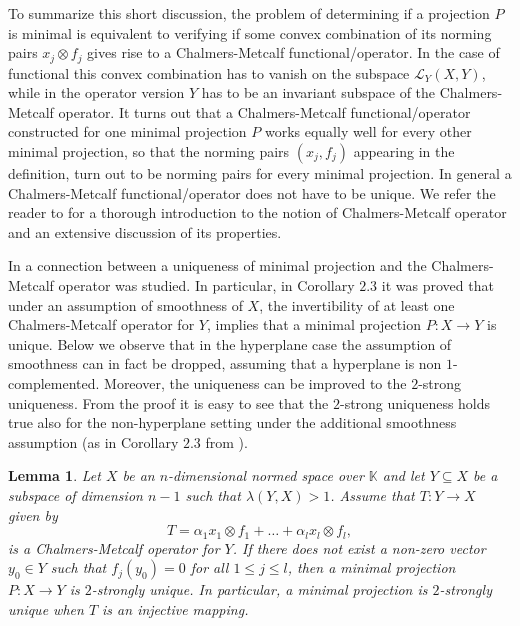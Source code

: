 \documentclass[12pt, reqno]{amsart}
\newtheorem{lem}[twr]{Lemma}
\theoremstyle{definition}
\theoremstyle{remark}
\numberwithin{equation}{section}
\begin{document}
To summarize this short discussion, the problem of determining if a projection $P$ is minimal is equivalent to verifying if some convex combination of its norming pairs $x_j \otimes f_j$ gives rise to a Chalmers-Metcalf functional/operator. In the case of functional this convex combination has to vanish on the subspace $\mathcal{L}_Y(X, Y)$, while in the operator version $Y$ has to be an invariant subspace of the Chalmers-Metcalf operator. It turns out that a Chalmers-Metcalf functional/operator constructed for one minimal projection $P$ works equally well for every other minimal projection, so that the norming pairs $(x_j, f_j)$ appearing in the definition, turn out to be norming pairs for every minimal projection. In general a Chalmers-Metcalf functional/operator does not have to be unique. We refer the reader to \cite{lewickiskrzypekoperator2} for a thorough introduction to the notion of Chalmers-Metcalf operator and an extensive discussion of its properties.

In \cite{lewickiskrzypekoperator} a connection between a uniqueness of minimal projection and the Chalmers-Metcalf operator was studied. In particular, in Corollary $2.3$ it was proved that under an assumption of smoothness of $X$, the invertibility of at least one Chalmers-Metcalf operator for $Y$, implies that a minimal projection $P: X \to Y$ is unique. Below we observe that in the hyperplane case the assumption of smoothness can in fact be dropped, assuming that a hyperplane is non $1$-complemented. Moreover, the uniqueness can be improved to the $2$-strong uniqueness. From the proof it is easy to see that the $2$-strong uniqueness holds true also for the non-hyperplane setting under the additional smoothness assumption (as in Corollary $2.3$ from \cite{lewickiskrzypekoperator}). 


\begin{lem}
\label{lemproj}
Let $X$ be an $n$-dimensional normed space over $\mathbb{K}$ and let $Y \subseteq X$ be a subspace of dimension $n-1$ such that $\lambda(Y, X)>1$. Assume that $T:Y \to X$ given by
$$T=\alpha_1 x_1 \otimes f_1 +  \ldots + \alpha_l x_l \otimes f_l,$$
is a Chalmers-Metcalf operator for $Y$. If there does not exist a non-zero vector $y_0 \in Y$ such that $f_j(y_0)=0$ for all $1 \leq j \leq l$, then a minimal projection $P: X \to Y$ is $2$-strongly unique. In particular, a minimal projection is $2$-strongly unique when $T$ is an injective mapping.
\end{lem}
\end{document}
